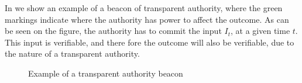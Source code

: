 In  we show an example of a beacon of transparent authority, where the green markings indicate where the authority has power to affect the outcome.
As can be seen on the figure, the authority has to commit the input $I_t$, at a given time $t$.
This input is verifiable, and there fore the outcome will also be verifiable, due to the nature of a transparent authority.


\begin{figure}[htb]
    \centering
    \footnotesize
    \caption{Example of a transparent authority beacon}\label{fig:transparent_beacon}
\end{figure}


